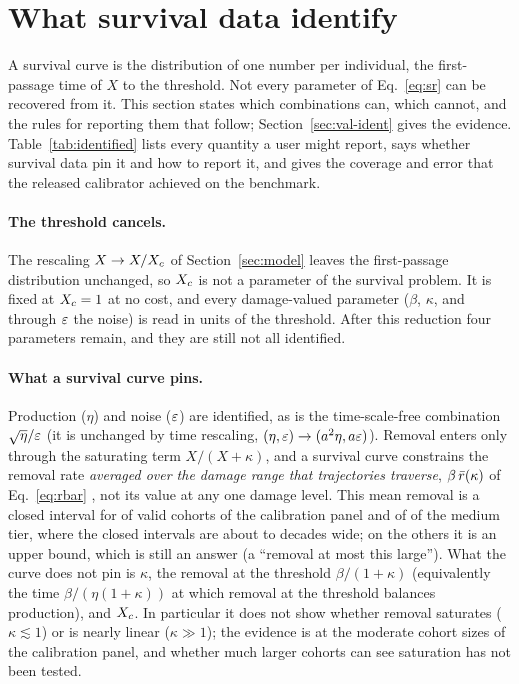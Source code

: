 \section{What survival data identify}\label{sec:identifiability}

A survival curve is the distribution of one number per individual, the first-passage time of $X$ to the threshold.
Not every parameter of Eq.~\eqref{eq:sr} can be recovered from it. This section states which combinations can, which
cannot, and the rules for reporting them that follow; Section~\ref{sec:val-ident} gives the evidence.
Table~\ref{tab:identified} lists every quantity a user might report, says whether survival data pin it and how to
report it, and gives the coverage and error that the released calibrator achieved on the benchmark.

\paragraph{The threshold cancels.} The rescaling $X\to X/X_c$ of Section~\ref{sec:model} leaves the first-passage
distribution unchanged, so $X_c$ is not a parameter of the survival problem. It is fixed at $X_c=1$ at no cost, and
every damage-valued parameter ($\beta$, $\kappa$, and through $\varepsilon$ the noise) is read in units of the threshold.
After this reduction four parameters remain, and they are still not all identified.

\paragraph{What a survival curve pins.} Production ($\eta$) and noise ($\varepsilon$) are identified, as is the
time-scale-free combination $\sqrt\eta/\varepsilon$ (it is unchanged by time rescaling, $(\eta,\varepsilon)\to(a^2\eta,a\varepsilon)$).
Removal enters only through the saturating term $X/(X+\kappa)$, and a survival curve constrains the removal rate
\emph{averaged over the damage range that trajectories traverse}, $\beta\,\bar r(\kappa)$ of Eq.~\eqref{eq:rbar}
\citep{raz2026damage}, not its value at any one damage level. This mean removal is a closed interval for 
of  valid cohorts of the calibration panel and  of  of the
medium tier, where the closed intervals are about  to  decades wide; on the
others it is an upper bound, which is still an answer (a ``removal at most this large''). What the curve does not
pin is $\kappa$, the removal at the threshold $\beta/(1+\kappa)$ (equivalently the time $\beta/(\eta(1+\kappa))$ at which
removal at the threshold balances production), and $X_c$. In particular it does not show whether removal saturates
($\kappa\lesssim1$) or is nearly linear ($\kappa\gg1$); the evidence is at the moderate cohort sizes of the
calibration panel, and whether much larger cohorts can see saturation has not been tested.

